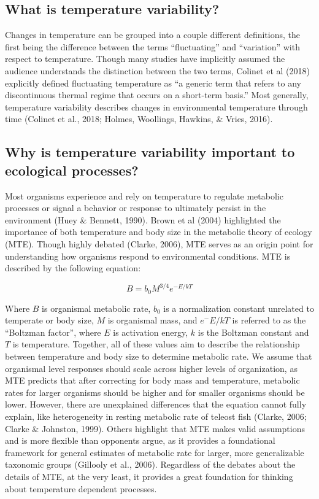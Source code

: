\documentclass[12pt,twoside]{reedthesis}
\begin{document}
\hypertarget{what-is-temperature-variability}{%
\subsection{What is temperature variability?}\label{what-is-temperature-variability}}

Changes in temperature can be grouped into a couple different definitions, the first being the difference between the terms ``fluctuating'' and ``variation'' with respect to temperature. Though many studies have implicitly assumed the audience understands the distinction between the two terms, Colinet et al (2018) explicitly defined fluctuating temperature as ``a generic term that refers to any discontinuous thermal regime that occurs on a short-term basis.'' Most generally, temperature variability describes changes in environmental temperature through time (Colinet et al., 2018; Holmes, Woollings, Hawkins, \& Vries, 2016).

\hypertarget{why-is-temperature-variability-important-to-ecological-processes}{%
\subsection{Why is temperature variability important to ecological processes?}\label{why-is-temperature-variability-important-to-ecological-processes}}

Most organisms experience and rely on temperature to regulate metabolic processes or signal a behavior or response to ultimately persist in the environment (Huey \& Bennett, 1990). Brown et al (2004) highlighted the importance of both temperature and body size in the metabolic theory of ecology (MTE). Though highly debated (Clarke, 2006), MTE serves as an origin point for understanding how organisms respond to environmental conditions. MTE is described by the following equation:

\[
B = b_0M^{3/4}e^{-E/kT}
\]

Where \(B\) is organismal metabolic rate, \(b_0\) is a normalization constant unrelated to temperate or body size, \(M\) is organismal mass, and \(e^-E/kT\) is referred to as the ``Boltzman factor'', where \(E\) is activation energy, \(k\) is the Boltzman constant and \(T\) is temperature. Together, all of these values aim to describe the relationship between temperature and body size to determine metabolic rate. We assume that organismal level responses should scale across higher levels of organization, as MTE predicts that after correcting for body mass and temperature, metabolic rates for larger organisms should be higher and for smaller organisms should be lower. However, there are unexplained differences that the equation cannot fully explain, like heterogeneity in resting metabolic rate of teleost fish (Clarke, 2006; Clarke \& Johnston, 1999). Others highlight that MTE makes valid assumptions and is more flexible than opponents argue, as it provides a foundational framework for general estimates of metabolic rate for larger, more generalizable taxonomic groups (Gillooly et al., 2006). Regardless of the debates about the details of MTE, at the very least, it provides a great foundation for thinking about temperature dependent processes.
\end{document}
